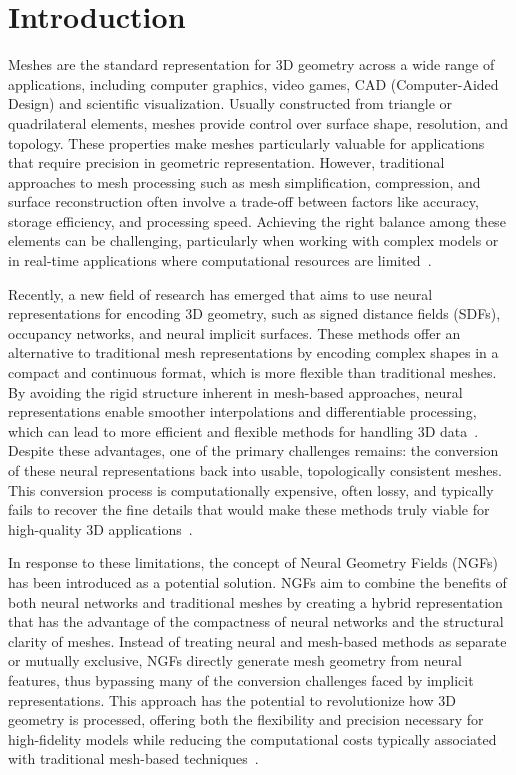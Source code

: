 \section{Introduction}
Meshes are the standard representation for 3D geometry across a wide range of applications, including computer graphics, video games, CAD (Computer-Aided Design) and scientific visualization.
Usually constructed from triangle or quadrilateral elements, meshes provide control over surface shape, resolution, and topology.
These properties make meshes particularly valuable for applications that require precision in geometric representation.
However, traditional approaches to mesh processing such as mesh simplification, compression, and surface reconstruction often involve a trade-off between factors like accuracy, storage efficiency, and processing speed.
Achieving the right balance among these elements can be challenging, particularly when working with complex models or in real-time applications where computational resources are limited~\cite{Maglo2015}.

Recently, a new field of research has emerged that aims to use neural representations for encoding 3D geometry, such as signed distance fields (SDFs), occupancy networks, and neural implicit surfaces.
These methods offer an alternative to traditional mesh representations by encoding complex shapes in a compact and continuous format, which is more flexible than traditional meshes.
By avoiding the rigid structure inherent in mesh-based approaches, neural representations enable smoother interpolations and differentiable processing, which can lead to more efficient and flexible methods for handling 3D data~\cite{Park2019}.
Despite these advantages, one of the primary challenges remains: the conversion of these neural representations back into usable, topologically consistent meshes.
This conversion process is computationally expensive, often lossy, and typically fails to recover the fine details that would make these methods truly viable for high-quality 3D applications~\cite{Sivaram2024}.

In response to these limitations, the concept of Neural Geometry Fields (NGFs) has been introduced as a potential solution.
NGFs aim to combine the benefits of both neural networks and traditional meshes by creating a hybrid representation that has the advantage of the compactness of neural networks and the structural clarity of meshes.
Instead of treating neural and mesh-based methods as separate or mutually exclusive, NGFs directly generate mesh geometry from neural features, thus bypassing many of the conversion challenges faced by implicit representations.
This approach has the potential to revolutionize how 3D geometry is processed, offering both the flexibility and precision necessary for high-fidelity models while reducing the computational costs typically associated with traditional mesh-based techniques~\cite{Sivaram2024}.

